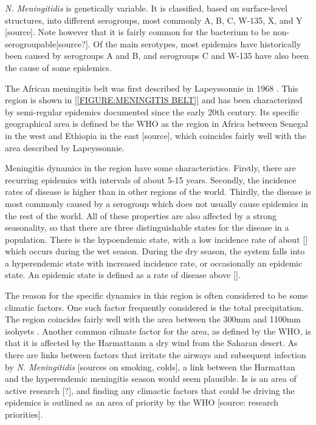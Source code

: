 \documentclass[10pt,a4paper]{article}
\begin{document}
\emph{N. Meningitidis} is genetically variable. It is classified, based on surface-level structures, into different serogroups, most commonly A, B, C, W-135, X, and Y [source]. Note however that it is fairly common for the bacterium to be non-serogroupable[source?]. Of the main serotypes, most epidemics have historically been caused by serogroups A and B, and serogroups C and W-135 have also been the cause of some epidemics. 

The African meningitis belt was first described by Lapeyssonnie in 1968 \cite{lapeyssonnie}. This region is shown in \cref{[FIGURE:MENINGITIS BELT]} and has been characterized by semi-regular epidemics documented since the early 20th century. Its specific geographical area is defined be the WHO as the region in Africa between Senegal in the west and Ethiopia in the east [source], which coincides fairly well with the area described by Lapeyssonnie.

Meningitis dynamics in the region have some characteristics. Firstly, there are recurring epidemics with intervals of about 5-15 years. Secondly, the incidence rates of disease is higher than in other regions of the world. Thirdly, the disease is most commonly caused by a serogroup which does not usually cause epidemics in the rest of the world. All of these properties are also affected by a strong seasonality, so that there are three distinguishable states for the disease in a population. There is the hypoendemic state, with a low incidence rate of about [] which occurs during the wet season. During the dry season, the system falls into a hyperendemic state with increased incidence rate, or occasionally an epidemic state. An epidemic state is defined as a rate of disease above []. \cite{mueller2010hypothetical}

The reason for the specific dynamics in this region is often considered to be some climatic factors. One such factor frequently considered is the total precipitation. The region coincides fairly well with the area between the 300mm and 1100mm isohyets \cite{molesworth2002meningitis}. Another common cilmate factor for the area, as defined by the WHO, is that it is affected by the Harmattanm a dry wind from the Saharan desert. As there are links between factors that irritate the airways and subsequent infection by \emph{N. Meningitidis} [sources on smoking, colds], a link between the Harmattan and the hyperendemic meningitis season would seem plausible. Is is an area of active research [?], and finding any climactic factors that could be driving the epidemics is outlined as an area of priority by the WHO [source: research priorities].
\end{document}
